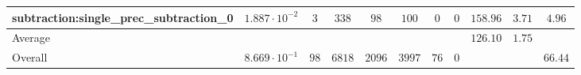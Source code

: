 \begin{tabular}{|l|c|c|c|c|c|c|c|c|c|c|}
subtraction:single\_prec\_subtraction\_0         & $ 1.887 \cdot 10^{-2} $ & $ 3      $ & $ 338  $ & $ 98   $ & $ 100   $ & $ 0  $ & $ 0 $ & $ 158.96      $ & $ 3.71    $ & $ 4.96    $ \\
\hline
Average                                          & $                     $ & $        $ & $      $ & $      $ & $       $ & $    $ & $   $ & $ 126.10      $ & $ 1.75    $ & $         $ \\
\hline
Overall                                          & $ 8.669 \cdot 10^{-1} $ & $ 98     $ & $ 6818 $ & $ 2096 $ & $ 3997  $ & $ 76 $ & $ 0 $ & $             $ & $         $ & $ 66.44   $ \\
\hline
\end{tabular}
